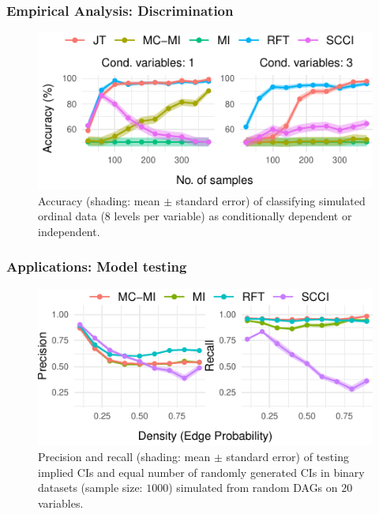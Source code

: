 \documentclass{beamer}
\begin{document}
\begin{frame}
	\frametitle{Empirical Analysis: Discrimination}
	\begin{figure}
		\centering
		\includegraphics{imgs/accuracy_ordinal.pdf}
		\caption{Accuracy (shading: mean $\pm$ standard error) of
		classifying simulated ordinal data (8 levels per variable) as
		conditionally dependent or independent.}	
	\end{figure}
\end{frame}

\begin{frame}
	\frametitle{Applications: Model testing}
	\begin{figure}
		\centering
		\includegraphics{imgs/model_testing.pdf}
		\caption{Precision and recall (shading: mean $\pm$ standard
		error) of testing implied CIs and equal number of randomly
		generated CIs in binary datasets (sample size: $1000$)
		simulated from random DAGs on $ 20 $ variables.}
	\end{figure}
\end{frame}
\end{document}
